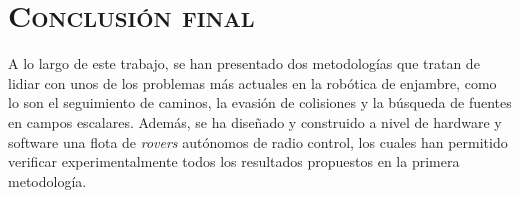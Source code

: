 \section*{\scshape\Large Conclusión final}
 \normalsize

A lo largo de este trabajo, se han presentado dos metodologías que tratan de lidiar con unos de los problemas más actuales en la robótica de enjambre, como lo son el seguimiento de caminos, la evasión de colisiones y la búsqueda de fuentes en campos escalares. Además, se ha diseñado y construido a nivel de hardware y software una flota de \textit{rovers} autónomos de radio control, los cuales han permitido verificar experimentalmente todos los resultados propuestos en la primera metodología.

